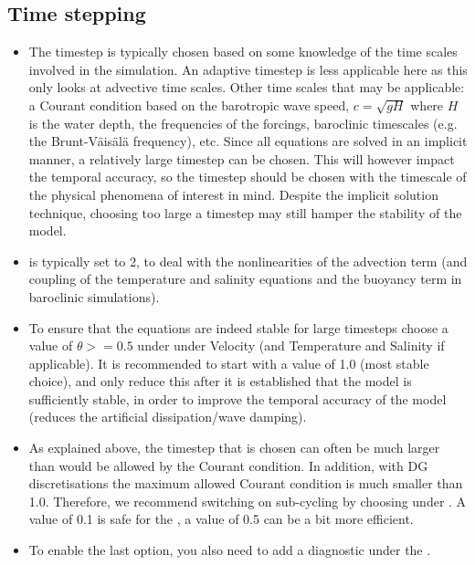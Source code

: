 \subsection{Time stepping}
\begin{itemize}
\item The timestep is typically chosen based on some knowledge of the time scales
  involved in the simulation. An adaptive timestep is less applicable here as
  this only looks at advective time scales. Other time scales that may be
  applicable: a Courant condition based on the barotropic wave speed, $c=\sqrt{gH}$ where
  $H$ is the water depth, the frequencies of the forcings, baroclinic timescales
  (e.g. the Brunt-V\"ais\"al\"a frequency), etc. Since all equations are solved in
  an implicit manner, a relatively large timestep can be chosen. This will
  however impact the temporal accuracy, so the timestep should be chosen with
  the timescale of the physical phenomena of interest in mind. Despite the
  implicit solution technique, choosing too large a timestep may still hamper
  the stability of the model.
\item {} is typically set to 2, to
  deal with the nonlinearities of the advection term (and coupling of the
  temperature and salinity equations and the buoyancy term in baroclinic
  simulations).
\item To ensure that the equations are indeed stable for large timesteps choose
  a value of $\theta>=0.5$ under 
  under Velocity (and Temperature and Salinity if applicable). It is
  recommended to start with a value of 1.0 (most stable choice), and only
  reduce this after it is established that the model is sufficiently stable, in
  order to improve the temporal accuracy of the model (reduces the artificial
  dissipation/wave damping).
\item As explained above, the timestep that is chosen can often be much larger
  than would be allowed by the Courant condition. In addition, with DG
  discretisations the maximum allowed Courant condition is much smaller than
  1.0. Therefore, we recommend switching on sub-cycling by choosing
   under
  . A value of 0.1 is safe for the
  , a value of 0.5 can be a
  bit more efficient.
\item To enable the last option, you also need to add a
  diagnostic  under the
  .
\end{itemize}

